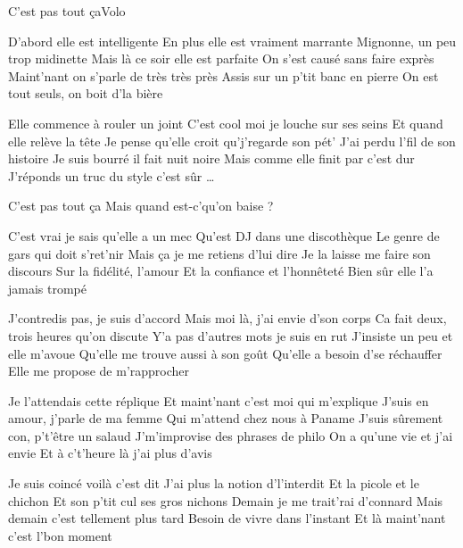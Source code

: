 \documentclass[a4paper,11pt,french]{article}
\begin{document}
\begin{Song}{C'est pas tout ça}{Volo}

\begin{multicols}{2}

\begin{Verse}
D'abord elle est intelligente
En plus elle est vraiment marrante 
Mignonne, un peu trop midinette
Mais là ce soir elle est parfaite 
On s'est causé sans faire exprès
Maint'nant on s'parle de très très près
Assis sur un p'tit banc en pierre
On est tout seuls, on boit d'la bière
\espaceInterStrophe

Elle commence à rouler un joint
C'est cool moi je louche sur ses seins
Et quand elle relève la tête
Je pense qu'elle croit qu'j'regarde son pét'
J'ai perdu l'fil de son histoire
Je suis bourré il fait nuit noire
Mais comme elle finit par \og c'est dur \fg
J'réponds un truc du style \og c'est sûr \fg\dots
\end{Verse}
\espaceInterStrophe

\begin{Chorus}
C'est pas tout ça 
Mais quand est-c'qu'on baise ?
\bis
\end{Chorus}
\espaceInterStrophe

\begin{Verse}
C'est vrai je sais qu'elle a un mec
Qu'est DJ dans une discothèque
Le genre de gars qui doit s'ret'nir
Mais ça je me retiens d'lui dire
Je la laisse me faire son discours
Sur la fidélité, l'amour
Et la confiance et l'honnêteté
Bien sûr elle l'a jamais trompé
\espaceInterStrophe

J'contredis pas, je suis d'accord
Mais moi là, j'ai envie d'son corps
Ca fait deux, trois heures qu'on discute
Y'a pas d'autres mots je suis en rut
J'insiste un peu et elle m'avoue
Qu'elle me trouve aussi à son goût
Qu'elle a besoin d'se réchauffer
Elle me propose de m'rapprocher
\end{Verse}
\columnbreak

\aurefrain
\espaceInterStrophe

\begin{Verse}
Je l'attendais cette réplique
Et maint'nant c'est moi qui m'explique 
J'suis en amour, j'parle de ma femme
Qui m'attend chez nous à Paname
J'suis sûrement con, p't'être un salaud
J'm'improvise des phrases de philo
On a qu'une vie et j'ai envie
Et à c't'heure là j'ai plus d'avis
\espaceInterStrophe

Je suis coincé voilà c'est dit
J'ai plus la notion d'l'interdit
Et la picole et le chichon
Et son p'tit cul ses gros nichons
Demain je me trait'rai d'connard
Mais demain c'est tellement plus tard
Besoin de vivre dans l'instant
Et là maint'nant c'est l'bon moment
\end{Verse}
\espaceInterStrophe


\end{multicols}
\end{Song}
\end{document}
